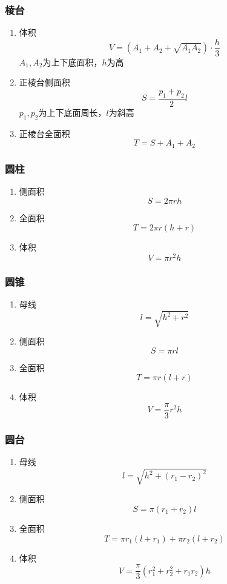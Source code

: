 \documentclass[a4paper]{article}
\begin{document}
\subsubsection{棱台}

\begin{enumerate}
	\item 体积
		$$V=(A_1+A_2+\sqrt{A_1A_2}) \cdot \frac{h}{3}$$
		$A_1,A_2$为上下底面积，$h$为高
	\item 正棱台侧面积
		$$S=\frac{p_1+p_2}{2}l$$
		$p_1,p_2$为上下底面周长，$l$为斜高
	\item 正棱台全面积
		$$T=S+A_1+A_2$$
\end{enumerate}

\subsubsection{圆柱}

\begin{enumerate}
	\item 侧面积
		$$S=2\pi rh$$
	\item 全面积
		$$T=2\pi r(h+r)$$
	\item 体积
		$$V=\pi r^2h$$
\end{enumerate}

\subsubsection{圆锥}

\begin{enumerate}
	\item 母线
		$$l=\sqrt{h^2+r^2}$$
	\item 侧面积
		$$S=\pi rl$$
	\item 全面积
		$$T=\pi r(l+r)$$
	\item 体积
		$$V=\frac{\pi}{3} r^2h$$
\end{enumerate}

\subsubsection{圆台}

\begin{enumerate}
	\item 母线
		$$l=\sqrt{h^2+(r_1-r_2)^2}$$
	\item 侧面积
		$$S=\pi(r_1+r_2)l$$
	\item 全面积
		$$T=\pi r_1(l+r_1)+\pi r_2(l+r_2)$$
	\item 体积
		$$V=\frac{\pi}{3}(r_1^2+r_2^2+r_1r_2)h$$
\end{enumerate}
\end{document}

